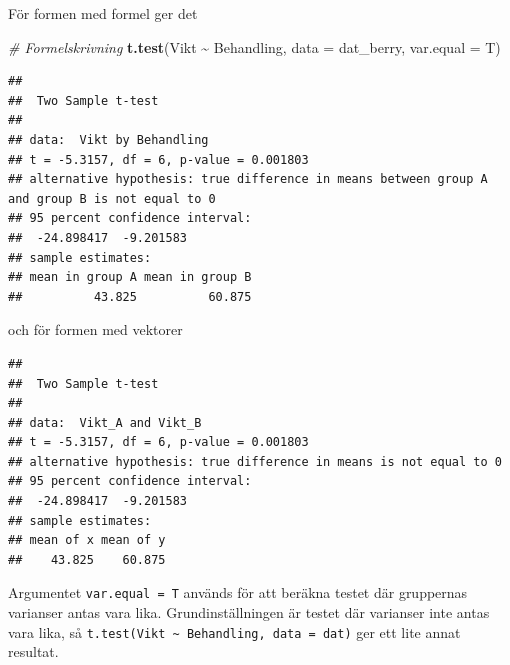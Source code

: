 \documentclass[
]{book}
\newenvironment{Shaded}{\begin{snugshade}}{\end{snugshade}}
\newcommand{\AttributeTok}[1]{\textcolor[rgb]{0.13,0.29,0.53}{#1}}
\newcommand{\CommentTok}[1]{\textcolor[rgb]{0.56,0.35,0.01}{\textit{#1}}}
\newcommand{\DocumentationTok}[1]{\textcolor[rgb]{0.56,0.35,0.01}{\textbf{\textit{#1}}}}
\newcommand{\FunctionTok}[1]{\textcolor[rgb]{0.13,0.29,0.53}{\textbf{#1}}}
\newcommand{\NormalTok}[1]{#1}
\newcommand{\OtherTok}[1]{\textcolor[rgb]{0.56,0.35,0.01}{#1}}
\newcommand{\SpecialCharTok}[1]{\textcolor[rgb]{0.81,0.36,0.00}{\textbf{#1}}}
\newcommand{\StringTok}[1]{\textcolor[rgb]{0.31,0.60,0.02}{#1}}
\theoremstyle{definition}
\theoremstyle{definition}
\theoremstyle{definition}
\theoremstyle{definition}
\theoremstyle{remark}
\begin{document}
För formen med formel ger det

\begin{Shaded}
\begin{Highlighting}[]
\CommentTok{\# Formelskrivning}
\FunctionTok{t.test}\NormalTok{(Vikt }\SpecialCharTok{\textasciitilde{}}\NormalTok{ Behandling, }\AttributeTok{data =}\NormalTok{ dat\_berry, }\AttributeTok{var.equal =}\NormalTok{ T)}
\end{Highlighting}
\end{Shaded}

\begin{verbatim}
## 
##  Two Sample t-test
## 
## data:  Vikt by Behandling
## t = -5.3157, df = 6, p-value = 0.001803
## alternative hypothesis: true difference in means between group A and group B is not equal to 0
## 95 percent confidence interval:
##  -24.898417  -9.201583
## sample estimates:
## mean in group A mean in group B 
##          43.825          60.875
\end{verbatim}

och för formen med vektorer

\begin{Shaded}
\end{Shaded}

\begin{verbatim}
## 
##  Two Sample t-test
## 
## data:  Vikt_A and Vikt_B
## t = -5.3157, df = 6, p-value = 0.001803
## alternative hypothesis: true difference in means is not equal to 0
## 95 percent confidence interval:
##  -24.898417  -9.201583
## sample estimates:
## mean of x mean of y 
##    43.825    60.875
\end{verbatim}

Argumentet \texttt{var.equal\ =\ T} används för att beräkna testet där gruppernas varianser antas vara lika. Grundinställningen är testet där varianser inte antas vara lika, så \texttt{t.test(Vikt\ \textasciitilde{}\ Behandling,\ data\ =\ dat)} ger ett lite annat resultat.
\end{document}
